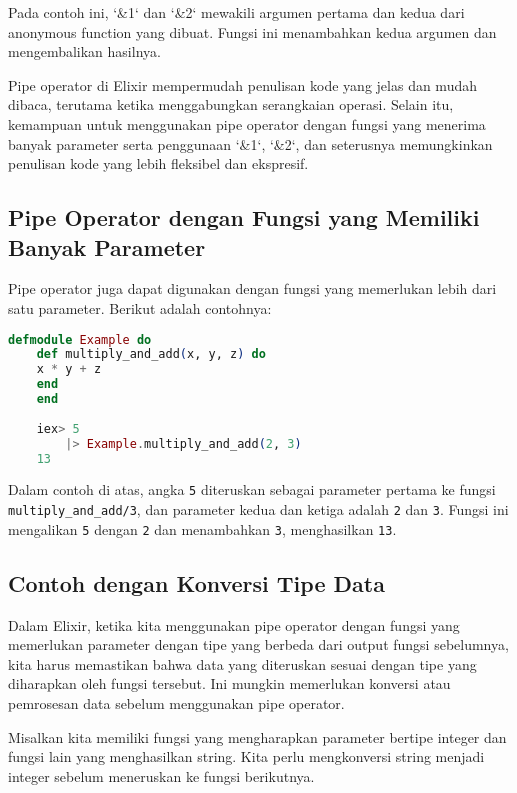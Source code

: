 Pada contoh ini, `\&1` dan `\&2` mewakili argumen pertama dan kedua dari anonymous function yang dibuat. Fungsi ini menambahkan kedua argumen dan mengembalikan hasilnya.

Pipe operator di Elixir mempermudah penulisan kode yang jelas dan mudah dibaca, terutama ketika menggabungkan serangkaian operasi. Selain itu, kemampuan untuk menggunakan pipe operator dengan fungsi yang menerima banyak parameter serta penggunaan `\&1`, `\&2`, dan seterusnya memungkinkan penulisan kode yang lebih fleksibel dan ekspresif.

\subsection{Pipe Operator dengan Fungsi yang Memiliki Banyak Parameter}

Pipe operator juga dapat digunakan dengan fungsi yang memerlukan lebih dari satu parameter. Berikut adalah contohnya:

\begin{lstlisting}[language=Elixir]
	defmodule Example do
	def multiply_and_add(x, y, z) do
	x * y + z
	end
	end
	
	iex> 5
		|> Example.multiply_and_add(2, 3)
	13
\end{lstlisting}

Dalam contoh di atas, angka \texttt{5} diteruskan sebagai parameter pertama ke fungsi \texttt{multiply\_and\_add/3}, dan parameter kedua dan ketiga adalah \texttt{2} dan \texttt{3}. Fungsi ini mengalikan \texttt{5} dengan \texttt{2} dan menambahkan \texttt{3}, menghasilkan \texttt{13}.



\subsection{Contoh dengan Konversi Tipe Data}

Dalam Elixir, ketika kita menggunakan pipe operator dengan fungsi yang memerlukan parameter dengan tipe yang berbeda dari output fungsi sebelumnya, kita harus memastikan bahwa data yang diteruskan sesuai dengan tipe yang diharapkan oleh fungsi tersebut. Ini mungkin memerlukan konversi atau pemrosesan data sebelum menggunakan pipe operator.

Misalkan kita memiliki fungsi yang mengharapkan parameter bertipe integer dan fungsi lain yang menghasilkan string. Kita perlu mengkonversi string menjadi integer sebelum meneruskan ke fungsi berikutnya.

